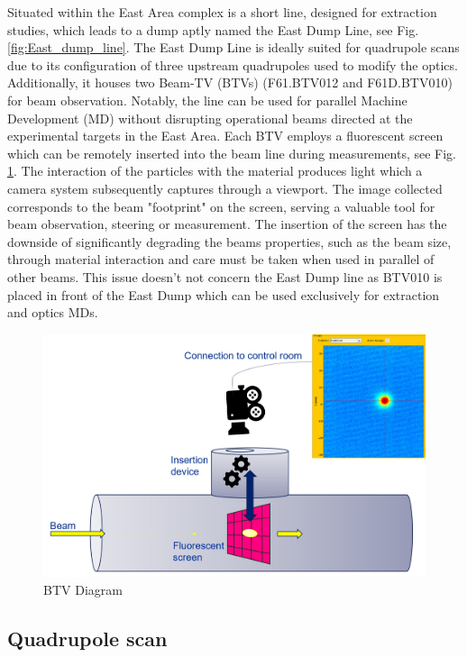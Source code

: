 Situated within the East Area complex is a short line, designed for extraction studies, which leads to a dump aptly named the East Dump Line, see Fig. \ref{fig:East_dump_line}. The East Dump Line is ideally suited for quadrupole scans due to its configuration of three upstream quadrupoles used to modify the optics. Additionally, it houses two Beam-TV (BTVs) (F61.BTV012 and F61D.BTV010) for beam observation. Notably, the line can be used for parallel Machine Development (MD) without disrupting operational beams directed at the experimental targets in the East Area. Each BTV employs a fluorescent screen which can be remotely inserted into the beam line during measurements, see Fig. \ref{fig:btv_diagram}. The interaction of the particles with the material produces light which a camera system subsequently captures through a viewport. The image collected corresponds to the beam "footprint" on the screen, serving a valuable tool for beam observation, steering or measurement. The insertion of the screen has the downside of significantly degrading the beams properties, such as the beam size, through material interaction and care must be taken when used in parallel of other beams. This issue doesn't not concern the East Dump line as BTV010 is placed in front of the East Dump which can be used exclusively for extraction and optics MDs.

\begin{figure}[htbp]
\centering
\includegraphics[width=0.7\linewidth]{03_Empirical_Measurements/images/BTV_diagram.jpg}
\caption{BTV Diagram}
\label{fig:btv_diagram}
\end{figure}

\subsection{Quadrupole scan}


